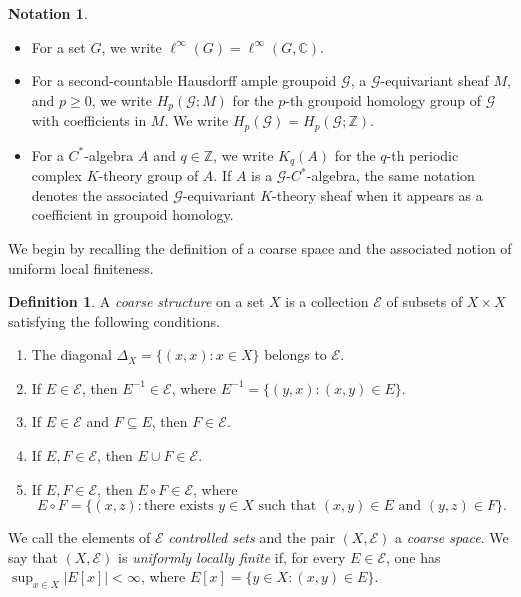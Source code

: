 \documentclass[pdflatex,sn-mathphys-num]{sn-jnl}%
\theoremstyle{plain}
\theoremstyle{remark}
\theoremstyle{definition}
\newtheorem{definition}[theorem]{Definition}
\newtheorem{notation}[theorem]{Notation}
\numberwithin{equation}{section}
\begin{document}
\begin{notation}
\begin{itemize}
    \item For a set \( G \), we write \( \ell^\infty(G)=\ell^\infty(G,\mathbb C) \).

    \item For a second-countable Hausdorff ample groupoid \( \mathcal G \), a \( \mathcal G \)-equivariant sheaf \( M \), and \( p\geq 0 \), we write \( H_p(\mathcal G;M) \) for the \( p \)-th groupoid homology group of \( \mathcal G \) with coefficients in \( M \). We write \( H_p(\mathcal G)=H_p(\mathcal G;\mathbb Z) \).

    \item For a \( C^* \)-algebra \( A \) and \( q\in\mathbb Z \), we write \( K_q(A) \) for the \( q \)-th periodic complex \( K \)-theory group of \( A \). If \( A \) is a \( \mathcal G \)-\( C^* \)-algebra, the same notation denotes the associated \( \mathcal G \)-equivariant \( K \)-theory sheaf when it appears as a coefficient in groupoid homology.
\end{itemize}
\end{notation}

We begin by recalling the definition of a coarse space and the associated notion of uniform local finiteness.

\begin{definition}
\label{def:coarse-space}
A \emph{coarse structure} on a set \( X \) is a collection \( \mathcal E \) of subsets of \( X\times X \) satisfying the following conditions.
\begin{enumerate}
    \item The diagonal \( \Delta_X=\{(x,x):x\in X\} \) belongs to \( \mathcal E \).
    \item If \( E\in\mathcal E \), then \( E^{-1}\in\mathcal E \), where \( E^{-1}=\{(y,x):(x,y)\in E\} \).
    \item If \( E\in\mathcal E \) and \( F\subseteq E \), then \( F\in\mathcal E \).
    \item If \( E,F\in\mathcal E \), then \( E\cup F\in\mathcal E \).
    \item If \( E,F\in\mathcal E \), then \( E\circ F\in\mathcal E \), where 
    \[ 
    E\circ F=\{(x,z):\text{there exists }y\in X\text{ such that }(x,y)\in E\text{ and }(y,z)\in F\} .
    \]
\end{enumerate}
We call the elements of \( \mathcal E \) \emph{controlled sets} and the pair \( (X,\mathcal E) \) a \emph{coarse space}. We say that \( (X,\mathcal E) \) is \emph{uniformly locally finite} if, for every \( E\in\mathcal E \), one has \( \sup_{x\in X}|E[x]|<\infty \), where \( E[x]=\{y\in X:(x,y)\in E\} \).
\end{definition}
\end{document}
